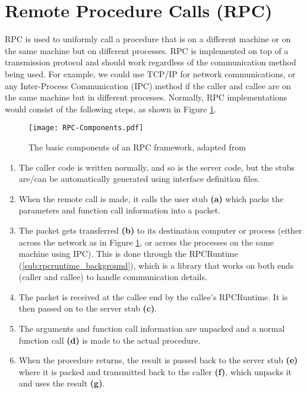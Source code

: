 \section{Remote Procedure Calls (RPC)} %
\label{sec:rpc_background}

RPC is used to uniformly call a procedure that is on a different machine or on the same machine but on different processes. RPC is implemented on top of a transmission protocol and should work regardless of the communication method being used. For example, we could use TCP/IP for network communications, or any Inter-Process Communication (IPC) method if the caller and callee are on the same machine but in different processes. Normally, RPC implementations would consist of the following steps, as shown in Figure \ref{fig:rpc-components}.

\begin{figure}
    \centering
    \texttt{[image: RPC-Components.pdf]} 
    \caption{The basic components of an RPC framework, adapted from \cite{birrell1984implementing}}
    \label{fig:rpc-components}
\end{figure}

\begin{enumerate}
  \item The caller code is written normally, and so is the server code, but the stubs are/can be automatically generated using interface definition files.
  \item When the remote call is made, it calls the user stub \textbf{(a)} which packs the parameters and function call information into a packet.
  \item The packet gets transferred \textbf{(b)} to its destination computer or process (either across the network as in Figure \ref{fig:rpc-components}, or across the processes on the same machine using IPC). This is done through the RPCRuntime (\ref{sub:rpcruntime_background}), which is a library that works on both ends (caller and callee) to handle communication details.
  \item The packet is received at the callee end by the callee's RPCRuntime. It is then passed on to the server stub \textbf{(c)}.
  \item The arguments and function call information are unpacked and a normal function call \textbf{(d)} is made to the actual procedure.
  \item When the procedure returns, the result is passed back to the server stub \textbf{(e)} where it is packed and transmitted back to the caller \textbf{(f)}, which unpacks it and uses the result \textbf{(g)}.
\end{enumerate}


